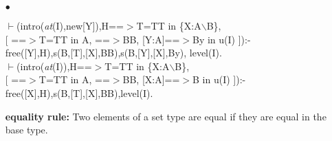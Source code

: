 \documentclass[11pt]{report}
\begin{document}
\begin{enumerate}
 {\bf membership rule:}
 $T$ is a member of a set type, if $T$ is a member of the
 base type and the defining property of the set type can be
 proven for $T$.
  
 \item[$\bullet$]
\begin{sf}\begin{tabbing}
$\vdash$(intro(\mbox{\it at}(I),new[Y]),H==$>$T=TT in \{X:A$\backslash$B\},\\[-0.15ex]
\hspace{2em}[ ==$>$T=TT in A, ==$>$BB, [Y:A]==$>$By in u(I) ]):-\\[-0.15ex]
\hspace{2em}free([Y],H),s(B,[T],[X],BB),s(B,[Y],[X],By), level(I).\\[-0.15ex]
$\vdash$(intro(\mbox{\it at}(I)),H==$>$T=TT in \{X:A$\backslash$B\},\\[-0.15ex]
\hspace{2em}[ ==$>$T=TT in A, ==$>$BB, [X:A]==$>$B in u(I) ]):-\\[-0.15ex]
\hspace{2em}free([X],H),s(B,[T],[X],BB),level(I).
\end{tabbing}\end{sf}

 {\bf equality rule:}
 Two elements of a set type are equal if they are equal in the
 base type.
  
 \end{enumerate}
  
\end{document}
